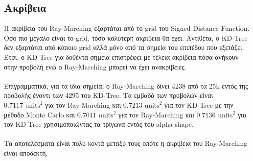 \documentclass{report}
\begin{document}
\subsection{Ακρίβεια}
Η ακρίβεια του Ray-Marching εξαρτάται από το grid του Signed Distance Function. Όσο πιο μεγάλο είναι το grid, τόσο
καλύτερη ακρίβεια θα έχει. Αντίθετα, ο KD-Tree δεν εξαρτάται από κάποιο grid αλλά μόνο από τα σημεία του επιπέδου που
εξετάζει. Έτσι, ο KD-Tree για δοθέντα σημεία επιστρέφει με τέλεια ακρίβεια πόσα ανήκουν στην προβολή ενώ ο Ray-Marching
μπορεί να έχει ανακρίβειες.
\\\\
Επιγραμματικά, για τα ίδια σημεία, ο Ray-Marching δίνει 4238 από τα 25k εντός της προβολής έναντι των 4295 του KD-Tree.
Τα εμβαδά των προβολών είναι $0.7117 \text{ units}^2$ για τον Ray-Marching και $0.7213 \text{ units}^2$ για τον KD-Tree 
με την μέθοδο Monte Carlo και $0.7041 \text{ units}^2$ για τον Ray-Marching και $0.7136 \text{ units}^2$ για τον KD-Tree
χρησιμοποιώντας τα τρίγωνα εντός του alpha shape.
\\\\
Τα αποτελέσματα είναι πολύ κοντά μεταξύ τους οπότε η ακρίβεια του Ray-Marching είναι αποδεκτή.


\clearpage
{}
\end{document}
